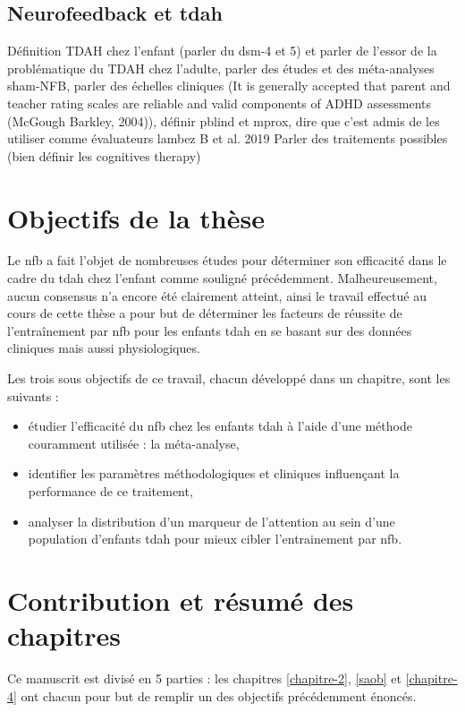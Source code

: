 \subsection{Neurofeedback et \gls{tdah}}
Définition TDAH chez l’enfant (parler du dsm-4 et 5) et parler de l’essor de la problématique du TDAH chez l’adulte, parler des études et des méta-analyses
sham-NFB, parler des échelles cliniques (It is generally accepted that parent and teacher rating scales are reliable and 
valid components of ADHD assessments (McGough  Barkley, 2004)), définir pblind et mprox, dire que c'est admis de les utiliser comme évaluateurs lambez B et al. 2019
Parler des traitements possibles (bien définir les cognitives therapy)

\section{Objectifs de la thèse}
Le \gls{nfb} a fait l'objet de nombreuses études pour déterminer son efficacité dans le cadre du \gls{tdah} chez l'enfant comme souligné précédemment.
Malheureusement, aucun consensus n'a encore été clairement atteint, ainsi le travail effectué au cours de cette thèse a pour but de déterminer les facteurs 
de réussite de l'entraînement par \gls{nfb} pour les enfants \gls{tdah} en se basant sur des données cliniques mais aussi physiologiques. 

Les trois sous objectifs de ce travail, chacun développé dans un chapitre, sont les suivants :
\renewcommand{\labelitemi}{$\bullet$}
\renewcommand{\labelitemii}{$\cdot$}
\begin{itemize}
\item étudier l'efficacité du \gls{nfb} chez les enfants \gls{tdah} à l'aide d'une méthode couramment utilisée : la méta-analyse,
\item identifier les paramètres méthodologiques et cliniques influençant la performance de ce traitement,
\item analyser la distribution d'un marqueur de l'attention au sein d'une population d'enfants \gls{tdah} pour mieux cibler
l'entrainement par \gls{nfb}. 
\end{itemize}

\section{Contribution et résumé des chapitres}

Ce manuscrit est divisé en 5 parties : les chapitres \ref{chapitre-2}, \ref{saob} et \ref{chapitre-4} ont chacun pour but de remplir un des objectifs précédemment énoncés.

